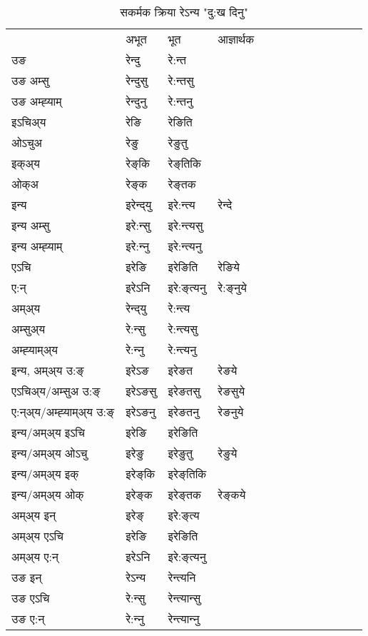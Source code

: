 \begin{table}[H]
\centering
\caption{\label{eŋt.vt} सकर्मक क्रिया  रेऽन्य  "दु:ख दिनु"  }
\begin{tabular}{l|l|l|l|l|l|l|l|l|l|l|l|l}  \toprule
&अभूत & भूत & आज्ञार्थक \\ 
उङ &रेन्दु &रे:न्त \\ 
उङ अम्सु&रेन्दुसु &रे:न्तसु \\ 
उङ अम्ह्‍याम्&रेन्दुनु &रे:न्तनु \\ 
इऽचिअ्य &रेङि &रेङिति   \\ 
ओऽचुअ        &रेङु &रेङुतु   \\ 
इक्अ्य&रेङ्‌कि &रेङ्‌तिकि   \\ 
ओक्अ &रेङ्‌क &रेङ्‌तक   \\ 
इन्य & इरेन्द्‌यु  & इरे:न्त्य &रेन्दे  \\ 
इन्य अम्सु& इरे:न्सु  & इरे:न्त्यसु   \\ 
इन्य अम्ह्‍याम्& इरे:न्‍नु  & इरे:न्त्यनु   \\ 
एऽचि & इरेङि & इरेङिति &रेङिये    \\ 
ए:न् & इरेऽनि  & इरे:ङ्‌त्यनु &रे:ङ्‌नुये  \\ 
अम्अ्य & रेन्द्‌यु  & रे:न्त्य  \\ 
अम्सुअ्य & रे:न्सु & रे:न्त्यसु  \\ 
अम्ह्‍याम्अ्य & रे:न्‍नु  & रे:न्त्यनु \\ 
\midrule
इन्य, अम्अ्य उ:ङ्‌ &इरेऽङ &इरेङत &रेङये \\ 
एऽचिअ्य/अम्सुअ उ:ङ्‌ &इरेऽङसु &इरेङतसु &रेङसुये \\ 
ए:न्अ्य/अम्ह्‍याम्अ्य उ:ङ्‌ &इरेऽङनु &इरेङतनु &रेङनुये \\ 
इन्य/अम्अ्य इऽचि &इरेङि &इरेङिति    \\ 
इन्य/अम्अ्य ओऽचु &इरेङु &इरेङुतु  &रेङुये  \\ 
इन्य/अम्अ्य इक् &इरेङ्‌कि &इरेङ्‌तिकि   \\ 
इन्य/अम्अ्य ओक् &इरेङ्‌क &इरेङ्‌तक  &रेङ्‌कये  \\ 
अम्अ्य इन् & इरेङ्‌ & इरे:ङ्‌त्य   \\ 
अम्अ्य एऽचि & इरेङि & इरेङिति    \\ 
अम्अ्य ए:न् & इरेऽनि  & इरे:ङ्‌त्यनु  \\ 
\midrule
उङ इन् & रेऽन्य  & रेन्त्यनि  \\ 
उङ एऽचि & रे:न्सु  & रेन्त्यान्सु   \\ 
उङ ए:न्& रे:न्‍नु  & रेन्त्यान्‍नु   \\ 
\bottomrule
\end{tabular}
\end{table}


